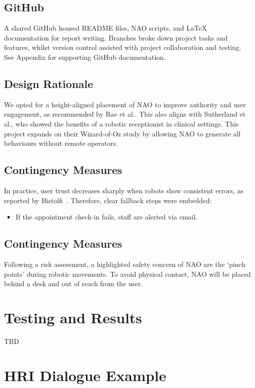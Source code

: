 \documentclass[conference]{IEEEtran}
\begin{document}
\subsection{GitHub} A shared GitHub housed README files, NAO scripts, and LaTeX documentation for report writing. Branches broke down project tasks and features, whilst version control assisted with project collaboration and testing. See Appendix for supporting GitHub documentation.

\subsection{Design Rationale} We opted for a height-aligned placement of NAO to improve authority and user engagement,
as recommended by Rae et al.\cite{Rae2013}. This also aligns with Sutherland et al.\cite{Sutherland2019}, who showed the benefits of
a robotic receptionist in clinical settings. This project expands on their Wizard-of-Oz study by allowing NAO to generate all behaviours without remote operators.

\subsection{Contingency Measures} In practice, user trust decreases sharply when robots show consistent errors, as reported by Bistolfi~\cite{Bistolfi2022}.
Therefore, clear fallback steps were embedded:
\begin{itemize}
        \item If the appointment check-in fails, staff are alerted via email.
\end{itemize}

\subsection{Contingency Measures} Following a risk assessment, a highlighted safety concern of NAO are the ‘pinch points’ during robotic movements. To avoid physical contact, NAO will be placed behind a desk and out of reach from the user.

\section{Testing and Results}

TBD

\section{HRI Dialogue Example}
\end{document}
